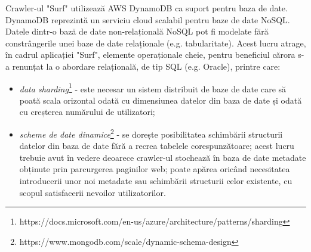 \noindent
Crawler-ul "Surf" utilizează AWS DynamoDB ca suport pentru baza de date. DynamoDB reprezintă un serviciu cloud scalabil pentru baze de date NoSQL. Datele dintr-o bază de date non-relațională NoSQL pot fi modelate fără constrângerile unei baze de date relaționale (e.g. tabularitate). Acest lucru atrage, în cadrul aplicației "Surf", elemente operaționale cheie, pentru beneficiul cărora s-a renunțat la o abordare relațională, de tip SQL (e.g. Oracle), printre care:


\begin{itemize}

	\item{\emph{data sharding}\footnote{https://docs.microsoft.com/en-us/azure/architecture/patterns/sharding} - este necesar un sistem distribuit de baze de date care să poată scala orizontal odată cu dimensiunea datelor din baza de date și odată cu creșterea numărului de utilizatori;}
	\item{\emph{scheme de date dinamice}\footnote{https://www.mongodb.com/scale/dynamic-schema-design} - se dorește posibilitatea schimbării structurii datelor din baza de date fără a recrea tabelele corespunzătoare; acest lucru trebuie avut în vedere deoarece crawler-ul stochează în baza de date metadate obținute prin parcurgerea paginilor web; poate apărea oricând necesitatea introducerii unor noi metadate sau schimbării structurii celor existente, cu scopul satisfacerii nevoilor utilizatorilor.}
	
\end{itemize}

